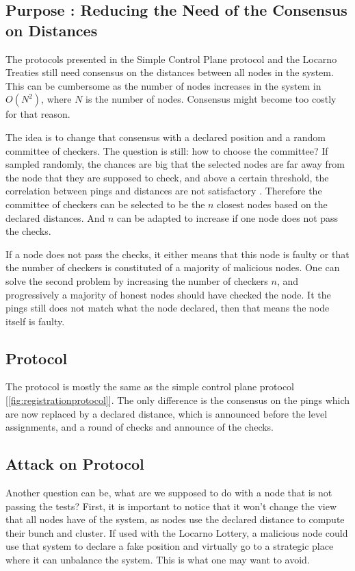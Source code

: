 \documentclass[a4paper,11pt,twoside=semi,openright]{report}
\begin{document}
\subsection{Purpose : Reducing the Need of the Consensus on Distances}
The protocols presented in the Simple Control Plane protocol and the Locarno
Treaties still need consensus on the distances between all nodes in the system.
This can be cumbersome as the number of nodes increases in the system in
$O(N^2)$, where $N$ is the number of nodes. Consensus might become too costly
for that reason.

The idea is to change that consensus with a declared position and a random
committee of checkers. The question is still: how to choose the committee? If
sampled randomly, the chances are big that the selected nodes are far away
from the node that they are supposed to check, and above a certain threshold,
the correlation between pings and distances are not satisfactory
\cite{Katz-bassett2006}. Therefore the committee of checkers can be selected to
be the $n$ closest nodes based on the declared distances. And $n$ can be
adapted to increase if one node does not pass the checks. 

If a node does not pass the checks, it either means that this node is faulty or
that the number of checkers is constituted of a majority of malicious nodes.
One can solve the second problem by increasing the number of checkers $n$, and
progressively a majority of honest nodes should have checked the node. It the
pings still does not match what the node declared, then that means the node
itself is faulty. 

\subsection{Protocol}
The protocol is mostly the same as the simple control plane protocol
[\autoref{fig:registrationprotocol}]. The only difference is the consensus on
the pings which are now replaced by a declared distance, which is announced
before the level assignments,  and a round of checks and announce of the checks. 

\subsection{Attack on Protocol}
Another question can be, what are we supposed to do with a node that is not
passing the tests? First, it is important to notice that it won't change the
view that all nodes have of the system, as nodes use the declared distance to
compute their bunch and cluster. If used with the Locarno Lottery, a malicious
node could use that system to declare a fake position and virtually go to a
strategic place where it can unbalance the system. This is what one may want to
avoid. 
\end{document}
